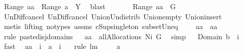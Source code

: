 \begin{isabellebody}
\ {\isachardoublequoteopen}Range\ {\isacharquery}aa\ {\isacharequal}\ Range\ a\ {\isasymunion}\ {\isacharquery}Y{\isachardoublequoteclose}\ \isamarkupfalse%
\ blast\ \isamarkupfalse%
\ \isamarkupfalse%
\ \isamarkupfalse%
\ \isanewline
{\isachardoublequoteopen}{\isasymUnion}\ Range\ {\isacharquery}aa\ {\isacharequal}\ G{\isachardoublequoteclose}\ \isamarkupfalse%
\ Un{\isacharunderscore}Diff{\isacharunderscore}cancel\ Un{\isacharunderscore}Diff{\isacharunderscore}cancel{}\ Union{\isacharunderscore}Un{\isacharunderscore}distrib\ Union{\isacharunderscore}empty\ Union{\isacharunderscore}insert\ \ \isanewline
{}\isamarkupfalse%
\ {\isacharparenleft}metis\ {\isacharparenleft}lifting{\isacharcomma}\ no{\isacharunderscore}types{\isacharparenright}\ assms{\isacharparenleft}{}{\isacharparenright}\ cSup{\isacharunderscore}singleton\ subset{\isacharunderscore}Un{\isacharunderscore}eq{\isacharparenright}\ \isamarkupfalse%
\ \isamarkupfalse%
\ \isanewline
{\isachardoublequoteopen}{\isacharquery}aa{\isacharprime}\ {\isacharequal}\ {\isacharquery}aa{\isachardoublequoteclose}\ \isamarkupfalse%
\ {}\ \isamarkupfalse%
\ {\isacharparenleft}rule\ paste{\isacharunderscore}disj{\isacharunderscore}domains{\isacharparenright}\isanewline
{}\isamarkupfalse%
\ \isamarkupfalse%
\ {\isachardoublequoteopen}{\isacharquery}aa{\isacharprime}\ {\isasymin}\ allAllocations{\isacharprime}{\isacharprime}\ {\isacharparenleft}N{\isasymunion}{\isacharbraceleft}{\isacharquery}i{\isacharbraceright}{\isacharparenright}\ G{\isachardoublequoteclose}\ \isamarkupfalse%
\ simp\isanewline
{}\isamarkupfalse%
\ \isamarkupfalse%
\ {\isachardoublequoteopen}Domain\ {\isacharquery}b\ {\isasymsubseteq}\ {\isacharbraceleft}{\isacharquery}i{\isacharbraceright}{\isachardoublequoteclose}\ \isamarkupfalse%
\ fast\ \isanewline
{}\isamarkupfalse%
\ {\isachardoublequoteopen}{\isacharquery}aa{\isacharprime}\ {\isacharminus}{\isacharminus}\ {\isacharquery}i\ {\isacharequal}\ a\ {\isacharminus}{\isacharminus}\ {\isacharquery}i{\isachardoublequoteclose}\ \ \isamarkupfalse%
\ {\isacharparenleft}rule\ lm{}{}{\isacharparenright}\isanewline
{}\isamarkupfalse%
\ \isamarkupfalse%
\ {\isachardoublequoteopen}{\isachardot}{\isachardot}{\isachardot}\ {\isacharequal}\ a{\isachardoublequoteclose}\ \isamarkupfalse%

\end{isabellebody}
